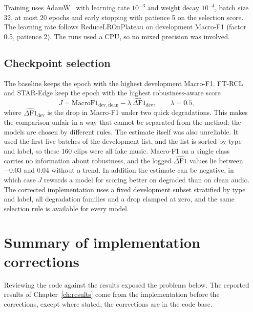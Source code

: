 Training uses AdamW~\cite{loshchilov2019adamw} with learning rate $10^{-3}$ and weight decay $10^{-4}$, batch size 32, at most 20 epochs and early stopping with patience 5 on the selection score. The learning rate follows ReduceLROnPlateau on development Macro-F1 (factor 0.5, patience 2). The runs used a CPU, so no mixed precision was involved.

\subsection{Checkpoint selection}
\label{sec:selection}

The baseline keeps the epoch with the highest development Macro-F1. FT-RCL and STAR-Edge keep the epoch with the highest robustness-aware score
\begin{equation}
J = \mathrm{MacroF1}_{\mathrm{dev,clean}} - \lambda\,\widehat{\Delta \mathrm{F1}}_{\mathrm{dev}}, \qquad \lambda = 0.5 ,
\label{eq:jscore}
\end{equation}
where $\widehat{\Delta \mathrm{F1}}_{\mathrm{dev}}$ is the drop in Macro-F1 under two quick degradations. This makes the comparison unfair in a way that cannot be separated from the method: the models are chosen by different rules. The estimate itself was also unreliable. It used the first five batches of the development list, and the list is sorted by type and label, so these 160 clips were all fake music. Macro-F1 on a single class carries no information about robustness, and the logged $\widehat{\Delta \mathrm{F1}}$ values lie between $-0.03$ and $0.04$ without a trend. In addition the estimate can be negative, in which case $J$ rewards a model for scoring better on degraded than on clean audio. The corrected implementation uses a fixed development subset stratified by type and label, all degradation families and a drop clamped at zero, and the same selection rule is available for every model.

\section{Summary of implementation corrections}
\label{sec:audit}

Reviewing the code against the results exposed the problems below. The reported results of Chapter~\ref{ch:results} come from the implementation before the corrections, except where stated; the corrections are in the code base.

